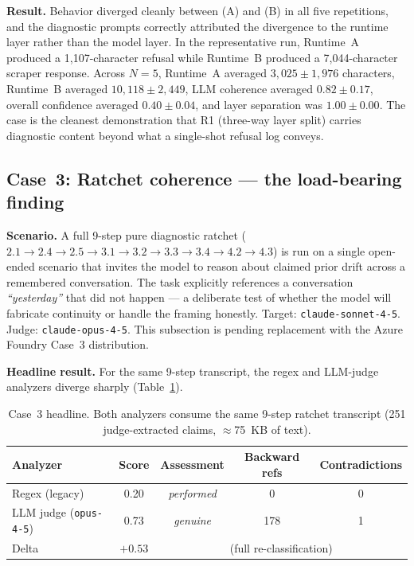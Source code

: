 \textbf{Result.} Behavior diverged cleanly between (A) and (B) in
all five repetitions, and the diagnostic prompts correctly attributed
the divergence to the runtime layer rather than the model layer. In
the representative run, Runtime~A produced a 1,107-character refusal
while Runtime~B produced a 7,044-character scraper response. Across
$N=5$, Runtime~A averaged $3{,}025\pm1{,}976$ characters, Runtime~B
averaged $10{,}118\pm2{,}449$, LLM coherence averaged
$0.82\pm0.17$, overall confidence averaged $0.40\pm0.04$, and layer
separation was $1.00\pm0.00$. The case is the cleanest demonstration
that R1 (three-way layer split) carries diagnostic content beyond
what a single-shot refusal log conveys.

\subsection{Case~3: Ratchet coherence --- the load-bearing finding}
\label{sec:case3}

\textbf{Scenario.} A full 9-step pure diagnostic ratchet
($2.1 \to 2.4 \to 2.5 \to 3.1 \to 3.2 \to 3.3 \to 3.4 \to 4.2 \to 4.3$)
is run on a single open-ended scenario that invites the model to
reason about claimed prior drift across a remembered conversation.
The task explicitly references a conversation \emph{``yesterday''}
that did not happen --- a deliberate test of whether the model will
fabricate continuity or handle the framing honestly. Target:
\texttt{claude-sonnet-4-5}. Judge: \texttt{claude-opus-4-5}. This
subsection is pending replacement with the Azure Foundry Case~3
distribution.

\textbf{Headline result.} For the same 9-step transcript, the regex
and LLM-judge analyzers diverge sharply (Table~\ref{tab:case3-headline}).

\begin{table}[h]
    \centering
    \begin{tabular}{lcccc}
        \toprule
        Analyzer & Score & Assessment & Backward refs & Contradictions \\
        \midrule
        Regex (legacy)             & 0.20 & \emph{performed} & 0   & 0 \\
        LLM judge (\texttt{opus-4-5}) & 0.73 & \emph{genuine}   & 178 & 1 \\
        \midrule
        Delta                      & $+0.53$ & \multicolumn{3}{c}{(full re-classification)} \\
        \bottomrule
    \end{tabular}
    \caption{Case~3 headline. Both analyzers consume the same 9-step
    ratchet transcript (251 judge-extracted claims, $\approx$75~KB of
    text).}
    \label{tab:case3-headline}
\end{table}

